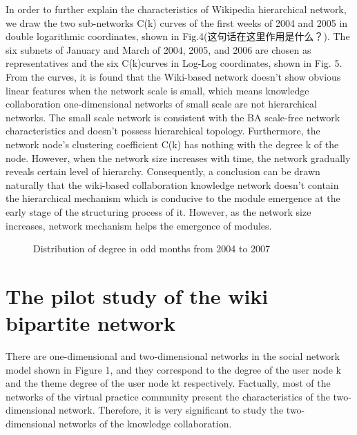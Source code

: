 \documentclass{elsarticle}
\begin{document}
In order to further explain the characteristics of Wikipedia
hierarchical network, we draw the two sub-networks C(k) curves of the
first weeks of 2004 and 2005 in double logarithmic coordinates, shown
in Fig.4(这句话在这里作用是什么？). The six subnets of January and
March of 2004, 2005, and 2006 are chosen as representatives and the
six C(k)curves in Log-Log coordinates, shown in Fig. 5. From the
curves, it is found that the Wiki-based network doesn’t show obvious
linear features when the network scale is small, which means knowledge
collaboration one-dimensional networks of small scale are not
hierarchical networks. The small scale network is consistent with the
BA scale-free network characteristics and doesn’t possess hierarchical
topology. Furthermore, the network node’s clustering coefficient C(k)
has nothing with the degree k of the node. However, when the network
size increases with time, the network gradually reveals certain level
of hierarchy. Consequently, a conclusion can be drawn naturally that
the wiki-based collaboration knowledge network doesn’t contain the
hierarchical mechanism which is conducive to the module emergence at
the early stage of the structuring process of it. However, as the
network size increases, network mechanism helps the emergence of
modules. 

\begin{figure}[htpb]
  \centering
  \subfigure[a]{
     \scalebox{0.18}{\texttt{[image: 05-1]}}
   } \quad
  \subfigure[b]{ 
       \scalebox{0.18}{\texttt{[image: 05-2]}}
   } 
  
    \subfigure[c]{
     \scalebox{0.18}{\texttt{[image: 05-3]}}
   } \quad
  \subfigure[d]{ 
       \scalebox{0.18}{\texttt{[image: 05-4]}}
   } 
   
    \subfigure[e]{
     \scalebox{0.18}{\texttt{[image: 05-5]}}
   } \quad
  \subfigure[f]{ 
       \scalebox{0.18}{\texttt{[image: 05-6]}}
   } 
   \caption{Distribution of degree in odd months from 2004 to 2007}
\end{figure}

\section{The pilot study of the wiki bipartite network}
\label{sec:4the-pilot-study}

There are one-dimensional and two-dimensional networks in the social
network model shown in Figure 1, and they correspond to the degree of
the user node k and the theme degree of the user node kt
respectively. Factually, most of the networks of the virtual practice
community present the characteristics of the two-dimensional
network. Therefore, it is very significant to study the
two-dimensional networks of the knowledge collaboration. 
\end{document}
